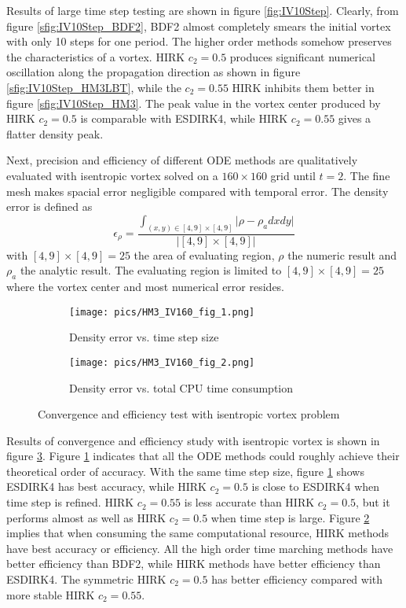 \documentclass[preprint,12pt]{elsarticle}
\begin{document}
Results of large time step testing are shown in figure \ref{fig:IV10Step}.
Clearly, from figure \ref{sfig:IV10Step_BDF2}, BDF2 almost completely
smears the initial vortex with only 10 steps for one period.
The higher order methods somehow preserves the characteristics of
a vortex. HIRK $c_2=0.5$ produces significant numerical oscillation along
the propagation direction as shown in figure \ref{sfig:IV10Step_HM3LBT},
while the $c_2=0.55$ HIRK inhibits them better in figure \ref{sfig:IV10Step_HM3}.
The peak value in the vortex center produced by HIRK $c_2=0.5$ is comparable with
ESDIRK4, while HIRK $c_2=0.55$ gives a flatter density peak.

Next, precision and efficiency of different ODE methods are
qualitatively evaluated with isentropic vortex solved on a $160\times160$
grid until $t=2$.
The fine mesh makes spacial error negligible compared with 
temporal error.
The density error is defined as
\begin{equation}
    \epsilon_\rho = \frac{\int_{(x,y)\in[4,9]\times[4,9]}{|\rho-\rho_a dxdy}|}{
    |[4,9]\times[4,9]|
    }
\end{equation}
with $[4,9]\times[4,9]=25$ the area of evaluating region, $\rho$ the numeric result
and $\rho_a$ the analytic result.
The evaluating region is limited to $[4,9]\times[4,9]=25$ 
where the vortex center 
and most numerical error resides. 



\begin{figure}[htbp]
    \centering
    \begin{subfigure}{0.5\textwidth}
        \texttt{[image: pics/HM3\_IV160\_fig\_1.png]}
        \caption[]{Density error vs. time step size }
        \label{sfig:IVTests_Conv}
    \end{subfigure}\hfill
    \begin{subfigure}{0.5\textwidth}
        \texttt{[image: pics/HM3\_IV160\_fig\_2.png]}
        \caption[]{Density error vs. total CPU time consumption}
        \label{sfig:IVTests_Eff}
    \end{subfigure}
    \caption[]{Convergence and efficiency test with isentropic vortex problem}
    \label{fig:IVTests}
\end{figure}

Results of convergence and efficiency study with isentropic vortex is 
shown in figure \ref{fig:IVTests}. 
Figure \ref{sfig:IVTests_Conv} indicates that all the ODE methods 
could roughly achieve their theoretical order of accuracy.
With the same time step size, figure \ref{sfig:IVTests_Conv} shows 
ESDIRK4 has best accuracy, while HIRK $c_2=0.5$ is close to 
ESDIRK4 when time step is refined. HIRK $c_2=0.55$ is less accurate 
than HIRK $c_2=0.5$, but it performs almost as well as 
HIRK $c_2=0.5$ when time step is large. 
Figure \ref{sfig:IVTests_Eff}
implies that when consuming the same computational resource,
HIRK methods have best accuracy or efficiency. All the high order 
time marching methods have better efficiency than BDF2, 
while HIRK methods have better efficiency than ESDIRK4. 
The symmetric HIRK $c_2=0.5$ has better efficiency 
compared with more stable HIRK $c_2=0.55$.
\end{document}
